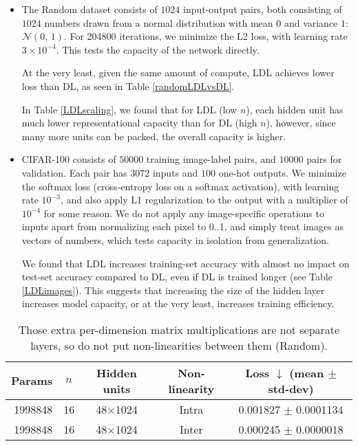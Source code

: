 \documentclass{article}
\begin{document}
\begin{itemize}
\item The Random dataset consists of $1024$ input-output pairs, both consisting of $1024$ numbers drawn from a normal distribution with mean $0$ and variance $1$: $\mathcal{N}(0,\,1)$. For 204800 iterations, we minimize the L2 loss, with learning rate $3 \times 10^{-4}$. This tests the capacity of the network directly.

At the very least, given the same amount of compute, LDL achieves lower loss than DL, as seen in Table \ref{randomLDLvsDL}.

In Table \ref{LDLscaling}, we found that for LDL (low $n$), each hidden unit has much lower representational capacity than for DL (high $n$), however, since many more units can be packed, the overall capacity is higher.

\item CIFAR-100 consists of $50000$ training image-label pairs, and $10000$ pairs for validation. Each pair has $3072$ inputs and $100$ one-hot outputs. We minimize the softmax loss (cross-entropy loss on a softmax activation), with learning rate $10^{-3}$, and also apply L1 regularization to the output with a multiplier of $10^{-4}$ for some reason. We do not apply any image-specific operations to inputs apart from normalizing each pixel to 0..1, and simply treat images as vectors of numbers, which tests capacity in isolation from generalization.

We found that LDL increases training-set accuracy with almost no impact on test-set accuracy compared to DL, even if DL is trained longer (see Table \ref{LDLimages}). This suggests that increasing the size of the hidden layer increases model capacity, or at the very least, increases training efficiency.
\end{itemize}

\begin{table}
\begin{center}
\begin{tabular}{rcccc}
\hline
Params & $n$ & Hidden units & Non-linearity & Loss $\downarrow$ (mean $\pm$ std-dev) \\
\hline
1998848 & 16 & 48$\times$1024 & Intra & 0.001827 $\pm$ 0.0001134 \\
1998848 & 16 & 48$\times$1024 & Inter & 0.000245 $\pm$ 0.0000018 \\
\hline
\end{tabular}
\end{center}
\caption{Those extra per-dimension matrix multiplications are not separate layers, so do not put non-linearities between them (Random).}
\label{LDLintraVSinter}
\end{table}
\end{document}
